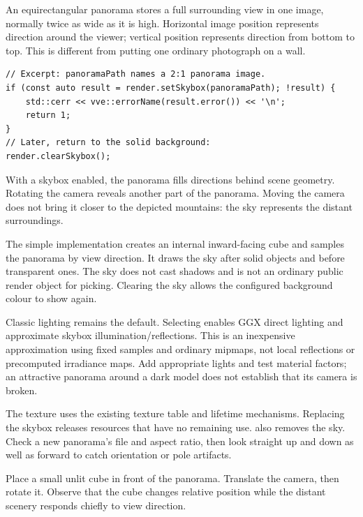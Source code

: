 \documentclass[11pt,a4paper]{article}
\begin{document}
An equirectangular panorama stores a full surrounding view in one image, normally twice as wide as it is high. Horizontal image position represents direction around the viewer; vertical position represents direction from bottom to top. This is different from putting one ordinary photograph on a wall.
\begin{lstlisting}
// Excerpt: panoramaPath names a 2:1 panorama image.
if (const auto result = render.setSkybox(panoramaPath); !result) {
    std::cerr << vve::errorName(result.error()) << '\n';
    return 1;
}
// Later, return to the solid background:
render.clearSkybox();
\end{lstlisting}
With a skybox enabled, the panorama fills directions behind scene geometry. Rotating the camera reveals another part of the panorama. Moving the camera does not bring it closer to the depicted mountains: the sky represents the distant surroundings.

The simple implementation creates an internal inward-facing cube and samples the panorama by view direction. It draws the sky after solid objects and before transparent ones. The sky does not cast shadows and is not an ordinary public render object for picking. Clearing the sky allows the configured background colour to show again.

Classic lighting remains the default. Selecting  enables GGX direct lighting and approximate skybox illumination/reflections. This is an inexpensive approximation using fixed samples and ordinary mipmaps, not local reflections or precomputed irradiance maps. Add appropriate lights and test material factors; an attractive panorama around a dark model does not establish that its camera is broken.

The texture uses the existing texture table and lifetime mechanisms. Replacing the skybox releases resources that have no remaining use.  also removes the sky. Check a new panorama's file and aspect ratio, then look straight up and down as well as forward to catch orientation or pole artifacts.

\begin{tryit}Place a small unlit cube in front of the panorama. Translate the camera, then rotate it. Observe that the cube changes relative position while the distant scenery responds chiefly to view direction.\end{tryit}
\end{document}
